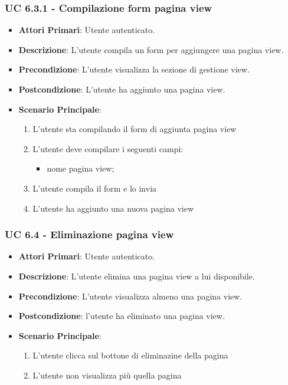			\subsubsection{UC 6.3.1 - Compilazione form pagina view}
			\begin{itemize}
				\item \textbf{Attori Primari}: Utente autenticato.
				\item \textbf{Descrizione}: L'utente compila un form per aggiungere una pagina view.
				\item \textbf{Precondizione}: L'utente visualizza la sezione di gestione view.
				\item \textbf{Postcondizione}: L'utente ha aggiunto una pagina view.
				\item \textbf{Scenario Principale}:
				\begin{enumerate}
					\item{L'utente sta compilando il form di aggiunta pagina view}
					\item{L'utente deve compilare i seguenti campi:}
					\begin{itemize}
						\item nome pagina view;
					\end{itemize}
					\item{L'utente compila il form e lo invia}
					\item{L'utente ha aggiunto una nuova pagina view}
				\end{enumerate}	
			\end{itemize}

			\subsubsection{UC 6.4 - Eliminazione pagina view}
			\begin{itemize}
				\item \textbf{Attori Primari}: Utente autenticato.
				\item \textbf{Descrizione}: L'utente elimina una pagina view a lui disponibile.
				\item \textbf{Precondizione}: L'utente visualizza almeno una pagina view.
				\item \textbf{Postcondizione}: l'utente ha eliminato una pagina view.
				\item \textbf{Scenario Principale}:
				\begin{enumerate}
					\item{L'utente clicca sul bottone di eliminazine della pagina}
					\item L'utente non visualizza più quella pagina
				\end{enumerate}	
			\end{itemize}

